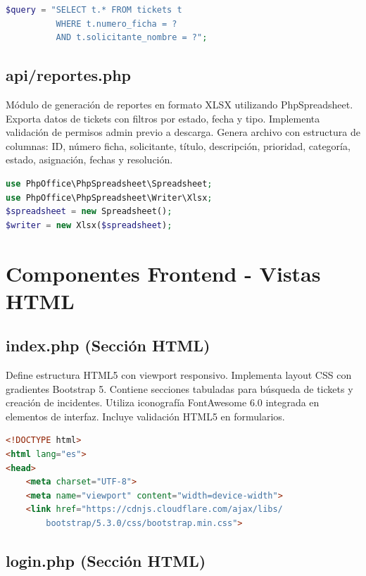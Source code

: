 \documentclass[12pt,a4paper]{article}
\begin{document}
\begin{lstlisting}[language=PHP,caption={Búsqueda pública}]
$query = "SELECT t.* FROM tickets t 
          WHERE t.numero_ficha = ? 
          AND t.solicitante_nombre = ?";
\end{lstlisting}

\subsection{api/reportes.php}

Módulo de generación de reportes en formato XLSX utilizando PhpSpreadsheet. Exporta datos de tickets con filtros por estado, fecha y tipo. Implementa validación de permisos admin previo a descarga. Genera archivo con estructura de columnas: ID, número ficha, solicitante, título, descripción, prioridad, categoría, estado, asignación, fechas y resolución.

\begin{lstlisting}[language=PHP,caption={Generación Excel}]
use PhpOffice\PhpSpreadsheet\Spreadsheet;
use PhpOffice\PhpSpreadsheet\Writer\Xlsx;
$spreadsheet = new Spreadsheet();
$writer = new Xlsx($spreadsheet);
\end{lstlisting}

\section{Componentes Frontend - Vistas HTML}

\subsection{index.php (Sección HTML)}

Define estructura HTML5 con viewport responsivo. Implementa layout CSS con gradientes Bootstrap 5. Contiene secciones tabuladas para búsqueda de tickets y creación de incidentes. Utiliza iconografía FontAwesome 6.0 integrada en elementos de interfaz. Incluye validación HTML5 en formularios.

\begin{lstlisting}[language=HTML,caption={Estructura HTML}]
<!DOCTYPE html>
<html lang="es">
<head>
    <meta charset="UTF-8">
    <meta name="viewport" content="width=device-width">
    <link href="https://cdnjs.cloudflare.com/ajax/libs/
        bootstrap/5.3.0/css/bootstrap.min.css">
\end{lstlisting}

\subsection{login.php (Sección HTML)}
\end{document}
